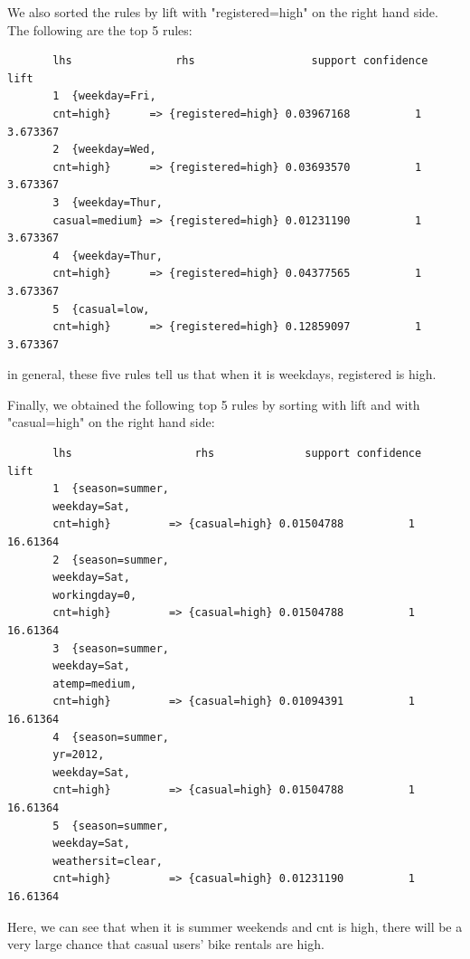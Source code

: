 \documentclass[12pt]{article}
\begin{document}
    We also sorted the rules by lift with "registered=high" on the right hand side. The following are the top 5 rules: \color{blue}
	\begin{verbatim}
	   lhs                rhs                  support confidence     lift
	   1  {weekday=Fri,                                                      
	   cnt=high}      => {registered=high} 0.03967168          1 3.673367
	   2  {weekday=Wed,                                                      
	   cnt=high}      => {registered=high} 0.03693570          1 3.673367
	   3  {weekday=Thur,                                                     
	   casual=medium} => {registered=high} 0.01231190          1 3.673367
	   4  {weekday=Thur,                                                     
	   cnt=high}      => {registered=high} 0.04377565          1 3.673367
	   5  {casual=low,                                                       
	   cnt=high}      => {registered=high} 0.12859097          1 3.673367
	\end{verbatim}\color{black}
	in general, these five rules tell us that when it is weekdays, registered is high.
	
	 Finally, we obtained the following top 5 rules by sorting with lift and with "casual=high" on the right hand side: \color{blue}
	\begin{verbatim}
	   lhs                   rhs              support confidence     lift
	   1  {season=summer,                                                   
	   weekday=Sat,                                                     
	   cnt=high}         => {casual=high} 0.01504788          1 16.61364
	   2  {season=summer,                                                   
	   weekday=Sat,                                                     
	   workingday=0,                                                    
	   cnt=high}         => {casual=high} 0.01504788          1 16.61364
	   3  {season=summer,                                                   
	   weekday=Sat,                                                     
	   atemp=medium,                                                    
	   cnt=high}         => {casual=high} 0.01094391          1 16.61364
	   4  {season=summer,                                                   
	   yr=2012,                                                         
	   weekday=Sat,                                                     
	   cnt=high}         => {casual=high} 0.01504788          1 16.61364
	   5  {season=summer,                                                   
	   weekday=Sat,                                                     
	   weathersit=clear,                                                
	   cnt=high}         => {casual=high} 0.01231190          1 16.61364
	\end{verbatim}\color{black}
	Here, we can see that when it is summer weekends and cnt is high, there will be a very large chance that casual users' bike rentals are high.  
	
\end{document}
